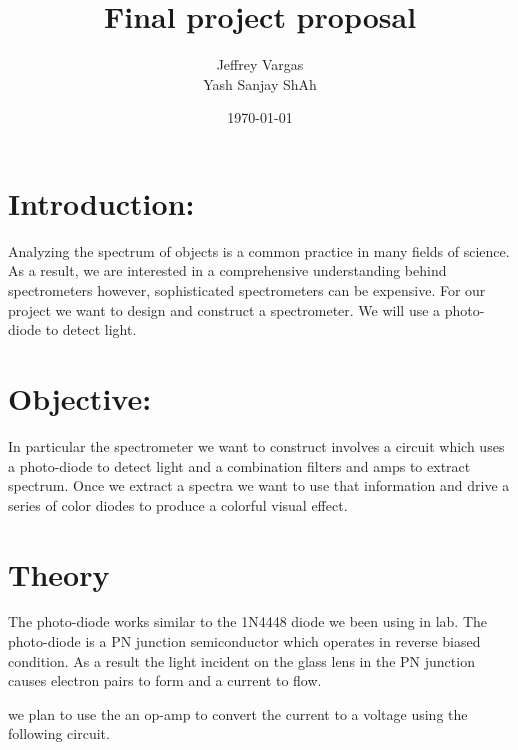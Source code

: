 \documentclass[12pt]{article}
\begin{document}
 \title{Final project proposal}
 \author{Jeffrey Vargas \\ Yash Sanjay ShAh}
 \date{\today}
 \maketitle




\section{Introduction:}
Analyzing the spectrum of objects is a common practice in many fields of science. As a result, we are interested in a comprehensive understanding behind spectrometers however, sophisticated spectrometers can be expensive. For our project we want to design and construct a spectrometer. We will use a photo-diode to detect light.

\section{Objective: }
In particular the spectrometer we want to construct involves a circuit which uses a photo-diode to detect light and a combination filters and amps to extract spectrum. Once we extract a spectra we want to use that information and drive a series of color diodes to produce a colorful visual effect.\\

\section{Theory}
The photo-diode works similar to the 1N4448 diode we been using in lab. The photo-diode is a PN junction semiconductor which operates in reverse biased condition. As a result the light incident on the glass lens in the PN junction causes electron pairs to form and a current to flow. 

we plan to use the an op-amp to convert the current to a voltage using the following circuit.
\end{document}
